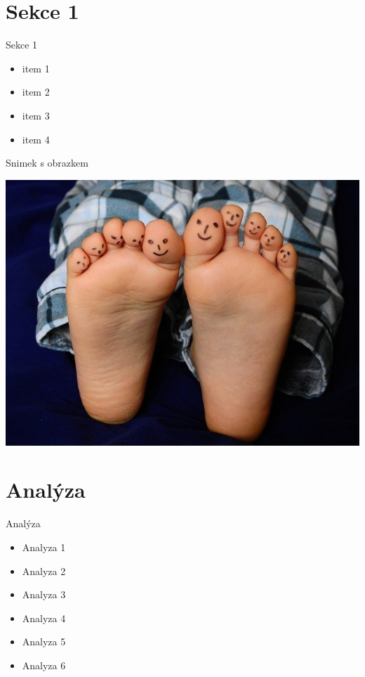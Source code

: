\documentclass[czech,aspectratio=169]{beamer}
\begin{document}
    \section{Sekce 1}
    \begin{frame}{Sekce 1}
        \begin{itemize}
            \item item 1
            \item item 2
            \item item 3
            \item item 4
        \end{itemize}
    \end{frame}
    
    \begin{frame}{Snimek s obrazkem}
        \begin{center}
            \includegraphics[width=0.6\paperwidth]{pic01.jpg}
        \end{center}
    \end{frame}
    
    \section{Analýza}
    \begin{frame}{Analýza}
        \begin{itemize}
            \item Analyza 1
            \item Analyza 2
            \item Analyza 3
            \item Analyza 4
            \item Analyza 5
            \item Analyza 6
        \end{itemize}
    \end{frame}
    
\end{document}
